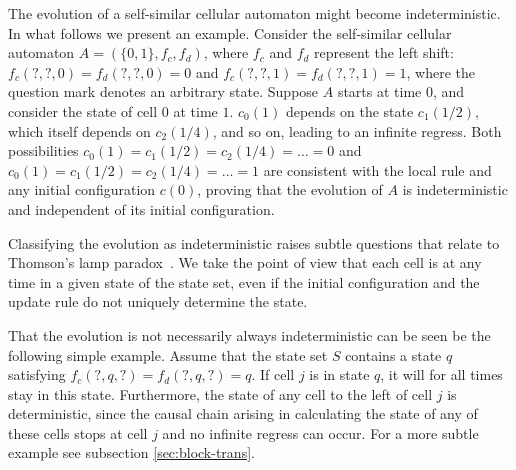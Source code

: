 \documentclass{article}
\theoremstyle{definition}
\begin{document}
The evolution of a self-similar cellular automaton might become indeterministic.
In what follows we present an example.
Consider the self-similar cellular automaton $A = (\{0,1\}, f_c, f_d)$, where $f_c$ and $f_d$ represent the left shift:
$f_c(?,?,0) = f_d(?,?,0) = 0$ and $f_c(?,?,1) = f_d(?,?,1) = 1$, where the question mark
denotes an arbitrary state.
Suppose $A$ starts at time $0$, and consider the state of cell $0$
at time $1$.
$c_0(1)$ depends on the state $c_1(1/2)$, which itself depends on $c_2(1/4)$, and so on, leading to an infinite regress.
Both possibilities $c_0(1) = c_1(1/2) = c_2(1/4) = \ldots = 0$ and $c_0(1) = c_1(1/2) = c_2(1/4) = \ldots = 1$
are consistent with the local rule and any initial configuration $c(0)$, proving that
the evolution of $A$ is indeterministic and independent of its initial configuration.

Classifying the evolution as indeterministic raises subtle questions that relate to  Thomson's lamp paradox~\cite{thom:54}.
We take the point of view that each cell is at any time in a given state of the state set, even if the initial configuration
and the update rule do not uniquely determine the state.

That the evolution is not necessarily always indeterministic can be seen be the following simple example. 
Assume that the state set $S$ contains a state $q$ satisfying $f_c(?,q,?) = f_d(?,q,?) = q$. 
If cell $j$ is in state $q$, it will for all times stay in this state.
Furthermore, the state of any cell to the left of cell $j$ is deterministic, since the 
causal chain arising in calculating the state of any of these cells stops at cell $j$ and no infinite regress can occur.
For a more subtle example see subsection \ref{sec:block-trans}.
\end{document}
